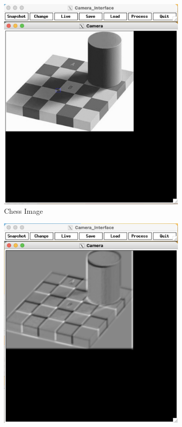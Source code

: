 \documentclass[12pt]{article}
\begin{document}
\begin{figure}
	\centering
	\begin{subfigure}[b]{0.475\textwidth}
		\centering
		\includegraphics[width=\textwidth]{hw3_results/chess_corner_temp}
		\caption[]%
		{{\small Chess Image}}    
		\label{fig:chess}
	\end{subfigure}
	\hfill
	\begin{subfigure}[b]{0.475\textwidth}  
		\centering 
		\includegraphics[width=\textwidth]{hw3_results/p2_chess_corner_template}

\end{subfigure}
\end{figure}
\end{document}
